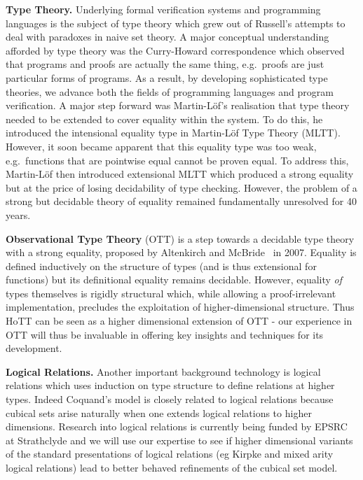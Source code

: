 \documentclass[a4paper,11pt]{article}
\newcommand{\eg}{{e.g.}\ }
\begin{document}
{\bf Type Theory.} Underlying formal verification systems and
programming languages is the subject of type theory which grew out of
Russell's attempts to deal with paradoxes in naive set theory. A major
conceptual understanding afforded by type theory was the Curry-Howard
correspondence which observed that programs and proofs are actually
the same thing, \eg proofs are just particular forms of programs. As a
result, by developing sophisticated type theories, we advance both the
fields of programming languages and program verification. A major step
forward was Martin-L\"of's realisation that type
theory needed to be extended to cover equality within the system. To
do this, he introduced the intensional equality type in Martin-L\"of
Type Theory (MLTT).  However, it soon became apparent that this
equality type was too weak, \eg functions that are pointwise equal
cannot be proven equal. To address this, Martin-L\"of then introduced
extensional MLTT which produced a strong equality but at the price of
losing decidability of type checking. However, the problem of a strong
but decidable theory of equality remained fundamentally unresolved for
40 years.


{\bf Observational Type Theory} (OTT) is a step towards a decidable
type theory with a strong equality, proposed by Altenkirch and
McBride~\cite{alti:ott-conf} in 2007. Equality is
defined inductively on the structure of types (and is thus extensional for
functions) but its definitional equality remains decidable. However,
equality {\em of} types themselves is rigidly structural which, while
allowing a proof-irrelevant implementation, precludes the exploitation
of higher-dimensional structure. Thus HoTT can be seen as a higher
dimensional extension of OTT - our experience in OTT will thus be
invaluable in offering key insights and techniques for its development.

{\bf Logical Relations.} Another important background technology is
logical relations which uses induction on type structure to define
relations at higher types. Indeed Coquand's model is closely related
to logical relations because cubical sets arise naturally when one
extends logical relations to higher dimensions. Research into logical
relations is currently being funded by EPSRC at Strathclyde and we
will use our expertise to see if higher dimensional variants of the
standard presentations of logical relations (eg Kirpke and mixed arity
logical relations) lead to better behaved refinements of the cubical
set model.
\end{document}

